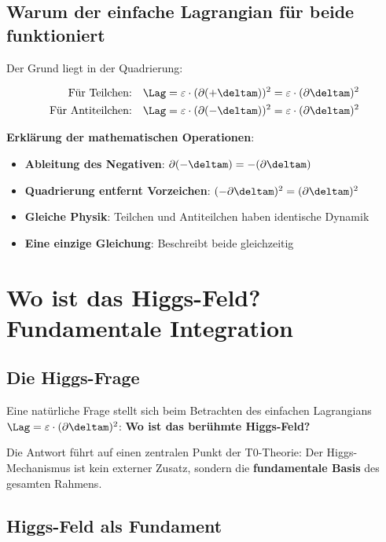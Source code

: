 	\subsection{Warum der einfache Lagrangian für beide funktioniert}
	
	Der Grund liegt in der Quadrierung:
	
	\begin{align}
		\text{Für Teilchen:} \quad \Lag &= \varepsilon \cdot (\partial (+\deltam))^2 = \varepsilon \cdot (\partial \deltam)^2 \\
		\text{Für Antiteilchen:} \quad \Lag &= \varepsilon \cdot (\partial (-\deltam))^2 = \varepsilon \cdot (\partial \deltam)^2
	\end{align}
	
	\textbf{Erklärung der mathematischen Operationen}:
	\begin{itemize}
		\item \textbf{Ableitung des Negativen}: $\partial(-\deltam) = -(\partial\deltam)$
		\item \textbf{Quadrierung entfernt Vorzeichen}: $(-\partial\deltam)^2 = (\partial\deltam)^2$
		\item \textbf{Gleiche Physik}: Teilchen und Antiteilchen haben identische Dynamik
		\item \textbf{Eine einzige Gleichung}: Beschreibt beide gleichzeitig
	\end{itemize}
	
	\section{Wo ist das Higgs-Feld? Fundamentale Integration}
	
	\subsection{Die Higgs-Frage}
	
	Eine natürliche Frage stellt sich beim Betrachten des einfachen Lagrangians $\Lag = \varepsilon \cdot (\partial \deltam)^2$: \textbf{Wo ist das berühmte Higgs-Feld?}
	
	Die Antwort führt auf einen zentralen Punkt der T0-Theorie: Der Higgs-Mechanismus ist kein externer Zusatz, sondern die \textbf{fundamentale Basis} des gesamten Rahmens.
	
	\subsection{Higgs-Feld als Fundament}
	
